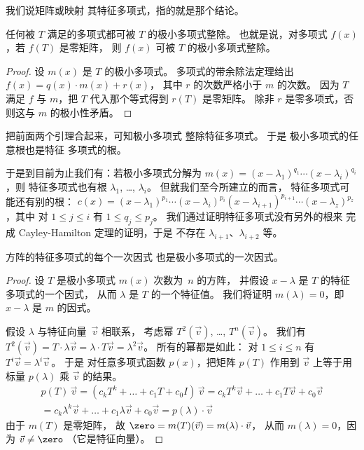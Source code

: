 我们说矩阵或映射
其特征多项式，指的就是那个结论。

\begin{lemma} \label{le:tSatisImpMinPolyDivides}
任何被 \( T \) 满足的多项式都可被
\( T \) 的极小多项式整除。
也就是说，对多项式 \( f(x) \)，若 \( f(T) \) 是零矩阵，
则 \( f(x) \) 可被 \( T \) 的极小多项式整除。
\end{lemma}

\begin{proof}
设 \( m(x) \) 是 \( T \) 的极小多项式。
多项式的带余除法定理给出
\( f(x)=q(x)\cdot m(x)+r(x) \)，
其中 \( r \) 的次数严格小于 \( m \) 的次数。
因为 $T$ 满足 $f$ 与 $m$，把 $T$ 代入那个等式得到
\( r(T) \) 是零矩阵。
除非 \( r \)
是零多项式，否则这与 \( m \) 的极小性矛盾。
\end{proof}

把前面两个引理合起来，可知极小多项式
整除特征多项式。
于是
极小多项式的任意根也是特征
多项式的根。

于是到目前为止我们有：若极小多项式分解为
\( m(x)=(x-\lambda_1)^{q_1}\cdots(x-\lambda_i)^{q_i} \)，则
特征多项式也有根 \( \lambda_1\), \ldots, 
\( \lambda_i \)。
但就我们至今所建立的而言，
特征多项式可能还有别的根：
\( c(x)=(x-\lambda_1)^{p_1}\cdots(x-\lambda_i)^{p_i}
     (x-\lambda_{i+1})^{p_{i+1}}\cdots(x-\lambda_z)^{p_z} \)，其中
对 \( 1\leq j \leq i \) 有 \( 1\leq q_j\leq p_j \)。
我们通过证明特征多项式没有另外的根来
完成 Cayley-Hamilton 定理的证明，于是
不存在 $\lambda_{i+1}$、$\lambda_{i+2}$ 等。

\begin{lemma}
方阵的特征多项式的每个一次因式
也是极小多项式的一次因式。
\end{lemma}

\begin{proof}
设 \( T \) 是极小多项式 \( m(x) \)
次数为~\( n \) 的方阵，
并假设 \( x-\lambda \) 是 \( T \) 的特征多项式的一个因式，
从而 \( \lambda \) 是 \( T \) 的一个特征值。
我们将证明 $m(\lambda)=0$，即 $x-\lambda$ 是 $m$ 的因式。

假设 $\lambda$ 与特征向量~$\vec{v}$ 相联系，
考虑幂 $T^2(\vec{v})$, \ldots, \( T^n(\vec{v}) \)。
我们有
$T^2(\vec{v})
=T\cdot\lambda\vec{v}=\lambda\cdot T\vec{v}=\lambda^2\vec{v}$。
所有的幂都是如此：
对 \( 1\leq i \leq n \) 有 $T^i\vec{v}=\lambda^i\vec{v}\,$。
于是
对任意多项式函数 \( p(x) \)，把矩阵 \( p(T) \)
作用到 \( \vec{v} \) 上等于用标量
\( p(\lambda) \) 乘 \( \vec{v} \) 的结果。
\begin{multline*}
  p(T)\,\vec{v}
  =(c_kT^k+\dots+c_1T+c_0I)\,\vec{v}
  =c_kT^k\vec{v}+\dots+c_1T\vec{v}+c_0\vec{v}  \\
  =c_k\lambda^k\vec{v}+\dots+c_1\lambda\vec{v}+c_0\vec{v}
  =p(\lambda)\cdot\vec{v}
\end{multline*}
由于 \( m(T) \) 是零矩阵，
故 \( \zero=m(T)(\vec{v})=m(\lambda)\cdot\vec{v} \)，
从而 \( m(\lambda)=0 \)，因为 \( \vec{v}\neq\zero \)
（它是特征向量）。
\end{proof}

